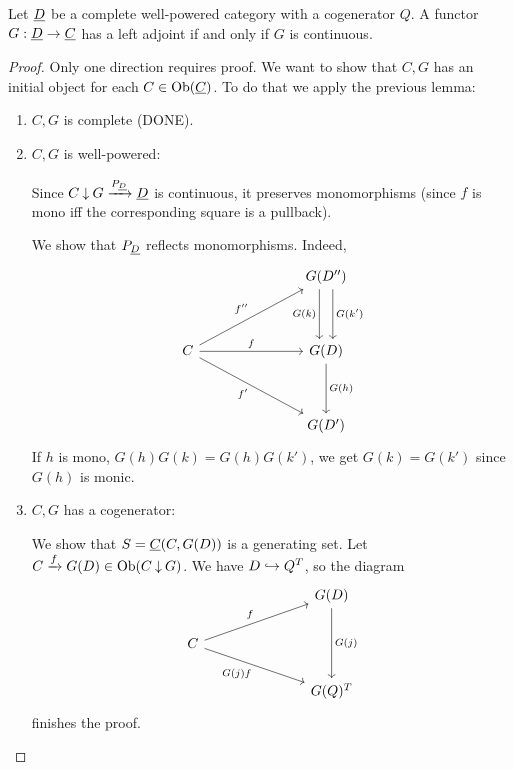 \begin{theorem*}[SAFT]
	Let \( \underline{D} \) be a complete well-powered category with a cogenerator \( Q \). A functor \( G: \underline{D} \to \underline{C} \) has a left adjoint if and only if \( G \) is continuous.
\end{theorem*}
\begin{proof}
	Only one direction requires proof. We want to show that \( C \comma G \) has an initial object for each \( C \in \operatorname{Ob}(\underline{C}) \). To do that we apply the previous lemma:
	\begin{enumerate}
		\item \( C \comma G \) is complete (DONE).
		\item \( C \comma G \) is well-powered:

			Since \( C \mathbin{\downarrow} G \xrightarrow{P_{\underline{D}}} \underline{D} \) is continuous, it preserves monomorphisms (since \( f \) is mono iff the corresponding square is a pullback).

			\vspace*{2mm}

			We show that \( P_{\underline{D}} \) reflects monomorphisms. Indeed,
			\[
				\begin{tikzcd}
					&&& {G(D'')} \\
					\\
					C &&& {G(D)} \\
					\\
					&&& {G(D')}
					\arrow["{G(k)}"', shift right=2, from=1-4, to=3-4]
					\arrow["{G(k')}", shift left=2, from=1-4, to=3-4]
					\arrow["{f''}", from=3-1, to=1-4]
					\arrow["f", from=3-1, to=3-4]
					\arrow["{f'}"', from=3-1, to=5-4]
					\arrow["{G(h)}", from=3-4, to=5-4]
				\end{tikzcd}
			\]
			If \( h \) is mono, \( G(h) G(k) = G(h) G(k') \), we get \( G(k) = G(k') \) since \( G(h) \) is monic.
		\item \( C \comma G \) has a cogenerator:

			\vspace*{2mm}

			We show that \( S = \underline{C}(C, G(D)) \) is a generating set. Let \( C \xrightarrow{f} G(D) \in \operatorname{Ob}(C \mathbin{\downarrow} G) \). We have \( D \hookrightarrow Q^T \), so the diagram
			\[
				\begin{tikzcd}
					&&& {G(D)} \\
					C \\
					&&& {G(Q)^T}
					\arrow["{G(j)}", from=1-4, to=3-4]
					\arrow["f", from=2-1, to=1-4]
					\arrow["{G(j) f}"', from=2-1, to=3-4]
				\end{tikzcd}
			\]
			finishes the proof.
	\end{enumerate}

\end{proof}